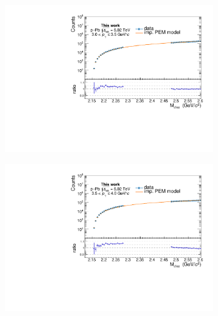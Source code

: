 \begin{appendices}
\begin{figure}[htb]
\begin{subfigure}{.5\textwidth}
  \centering
  \captionsetup{justification=centering}
  \includegraphics[width=\linewidth]{gfx/appendix/impem/can_blindPEMimp6}
  \caption{}
\end{subfigure}%
\begin{subfigure}{.5\textwidth}
  \centering
  \captionsetup{justification=centering}
  \includegraphics[width=\linewidth]{gfx/appendix/impem/can_blindPEMimp7}
  \caption{}
\end{subfigure}
\begin{subfigure}{.5\textwidth}
  \centering
  \captionsetup{justification=centering}

\end{subfigure}
\end{figure}
\end{appendices}
